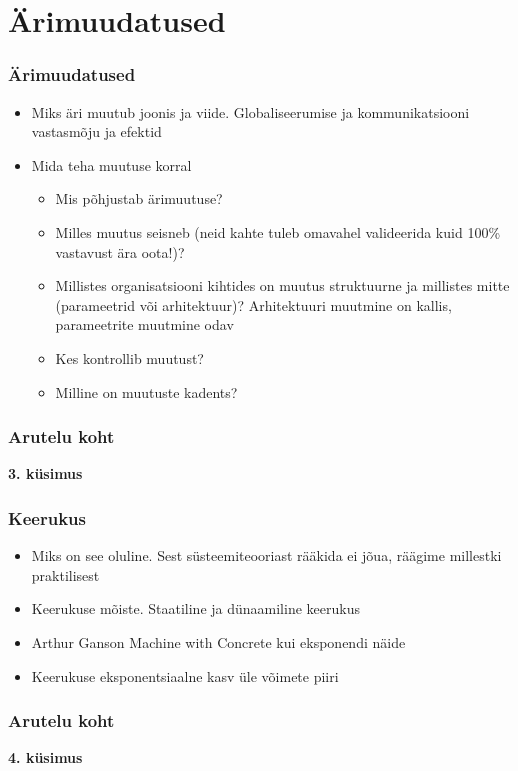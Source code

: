 \section{Ärimuudatused}
\begin{frame}[fragile]
  \frametitle{Ärimuudatused}
	\begin{itemize}
		\item Miks äri muutub \cite{foster2011creative} joonis ja viide. Globaliseerumise ja kommunikatsiooni vastasmõju ja efektid
		\item Mida teha muutuse korral
		\begin{itemize}
			\item Mis põhjustab ärimuutuse?
			\item Milles muutus seisneb (neid kahte tuleb omavahel valideerida kuid 100\% vastavust ära oota!)?
			\item Millistes organisatsiooni kihtides on muutus struktuurne ja millistes mitte (parameetrid või arhitektuur)? Arhitektuuri muutmine on kallis, parameetrite muutmine odav
			\item Kes kontrollib muutust?
			\item Milline on muutuste kadents?
		\end{itemize}

	\end{itemize}
\end{frame}

\begin{frame}[fragile]
  \frametitle{Arutelu koht}
		\begin{center}
			\textbf{3. küsimus}
		\end{center}
\end{frame}

\begin{frame}[fragile]
  \frametitle{Keerukus}
	\begin{itemize}
		\item Miks on see oluline. Sest süsteemiteooriast rääkida ei jõua, räägime millestki praktilisest
		\item Keerukuse mõiste. Staatiline ja dünaamiline keerukus
		\item Arthur Ganson Machine with Concrete kui eksponendi näide
		\item Keerukuse eksponentsiaalne kasv üle võimete piiri
	\end{itemize}
\end{frame}



\begin{frame}[fragile]
  \frametitle{Arutelu koht}
		\begin{center}
			\textbf{4. küsimus}
		\end{center}
\end{frame}

